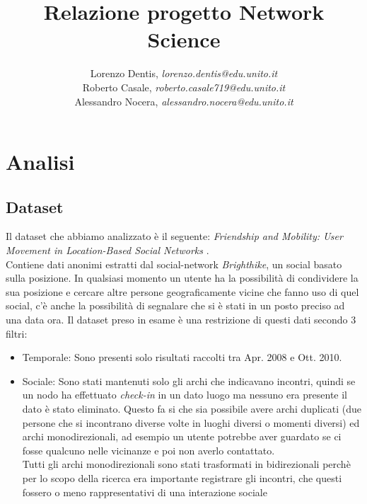 \documentclass[a4paper]{article}
\begin{document}
\author{
	Lorenzo Dentis, \textit{lorenzo.dentis@edu.unito.it}\\
	Roberto Casale, \textit{roberto.casale719@edu.unito.it}\\
	Alessandro Nocera, \textit{alessandro.nocera@edu.unito.it}
}
\title{Relazione progetto Network Science}
\maketitle

\tableofcontents


\section{Analisi}
\subsection{Dataset}
Il dataset che abbiamo analizzato è il seguente: \textit{ Friendship and Mobility: User Movement in Location-Based Social Networks }\cite{original_paper}.\\
Contiene dati anonimi estratti dal social-network \textit{Brighthike}, un social basato sulla posizione.
In qualsiasi momento un utente ha la possibilità di condividere la sua posizione e cercare altre persone geograficamente vicine che fanno uso di quel social, c'è anche la possibilità di segnalare che si è stati in un posto preciso ad una data ora.
Il dataset preso in esame è una restrizione di questi dati secondo 3 filtri:
\begin{itemize}
	\item Temporale: Sono presenti solo risultati raccolti tra Apr. 2008 e Ott. 2010.
	\item Sociale: Sono stati mantenuti solo gli archi che indicavano incontri, quindi se un nodo ha effettuato \textit{check-in} in un dato luogo ma nessuno era presente il dato è stato eliminato.
		Questo fa si che sia possibile avere archi duplicati (due persone che si incontrano diverse volte in luoghi diversi o momenti diversi) ed archi monodirezionali, ad esempio un utente potrebbe aver guardato se ci fosse qualcuno nelle vicinanze e poi non averlo contattato.\\
		Tutti gli archi monodirezionali sono stati trasformati in bidirezionali perchè per lo scopo della ricerca era importante registrare gli incontri, che questi fossero o meno rappresentativi di una interazione sociale
\end{itemize}
\end{document}
